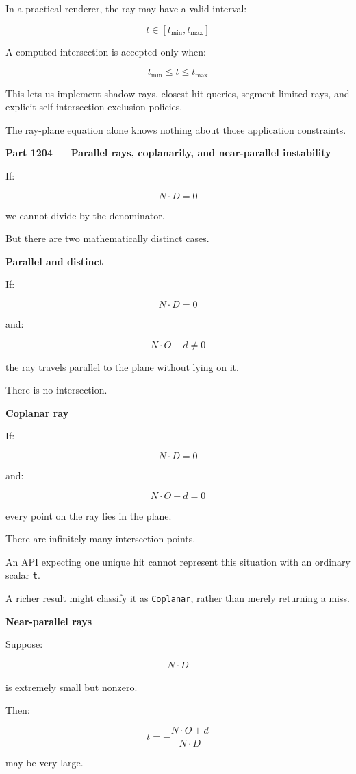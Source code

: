 In a practical renderer, the ray may have a valid interval:

\[
t\in[t_{\min},t_{\max}]
\]

A computed intersection is accepted only when:

\[
\boxed{ t_{\min}\le t\le t_{\max} }
\]

This lets us implement shadow rays, closest-hit queries, segment-limited rays, and explicit self-intersection exclusion policies.

The ray-plane equation alone knows nothing about those application constraints.

\textbf{Part 1204 --- Parallel rays, coplanarity, and near-parallel instability}

If:

\[
N\cdot D=0
\]

we cannot divide by the denominator.

But there are two mathematically distinct cases.

\textbf{Parallel and distinct}

If:

\[
N\cdot D=0
\]

and:

\[
N\cdot O+d\ne0
\]

the ray travels parallel to the plane without lying on it.

There is no intersection.

\textbf{Coplanar ray}

If:

\[
N\cdot D=0
\]

and:

\[
N\cdot O+d=0
\]

every point on the ray lies in the plane.

There are infinitely many intersection points.

An API expecting one unique hit cannot represent this situation with an ordinary scalar \texttt{t}.

A richer result might classify it as \texttt{Coplanar}, rather than merely returning a miss.

\textbf{Near-parallel rays}

Suppose:

\[
|N\cdot D|
\]

is extremely small but nonzero.

Then:

\[
t=-\frac{N\cdot O+d}{N\cdot D}
\]

may be very large.


